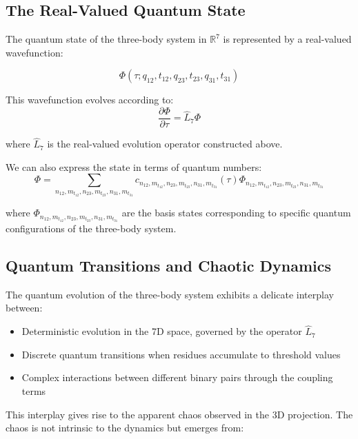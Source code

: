 \documentclass{article}
\begin{document}
\subsection{The Real-Valued Quantum State}

The quantum state of the three-body system in $\mathbb{R}^7$ is represented by a real-valued wavefunction:

\begin{equation}
\Phi(\tau; q_{12}, t_{12}, q_{23}, t_{23}, q_{31}, t_{31})
\end{equation}

This wavefunction evolves according to:
\begin{equation}
\frac{\partial \Phi}{\partial \tau} = \hat{L}_7 \Phi
\end{equation}

where $\hat{L}_7$ is the real-valued evolution operator constructed above.

We can also express the state in terms of quantum numbers:
\begin{equation}
\Phi = \sum_{n_{12},m_{t_{12}},n_{23},m_{t_{23}},n_{31},m_{t_{31}}} c_{n_{12},m_{t_{12}},n_{23},m_{t_{23}},n_{31},m_{t_{31}}}(\tau) \Phi_{n_{12},m_{t_{12}},n_{23},m_{t_{23}},n_{31},m_{t_{31}}}
\end{equation}

where $\Phi_{n_{12},m_{t_{12}},n_{23},m_{t_{23}},n_{31},m_{t_{31}}}$ are the basis states corresponding to specific quantum configurations of the three-body system.

\subsection{Quantum Transitions and Chaotic Dynamics}

The quantum evolution of the three-body system exhibits a delicate interplay between:
\begin{itemize}
\item Deterministic evolution in the 7D space, governed by the operator $\hat{L}_7$
\item Discrete quantum transitions when residues accumulate to threshold values
\item Complex interactions between different binary pairs through the coupling terms
\end{itemize}

This interplay gives rise to the apparent chaos observed in the 3D projection. The chaos is not intrinsic to the dynamics but emerges from:
\end{document}
